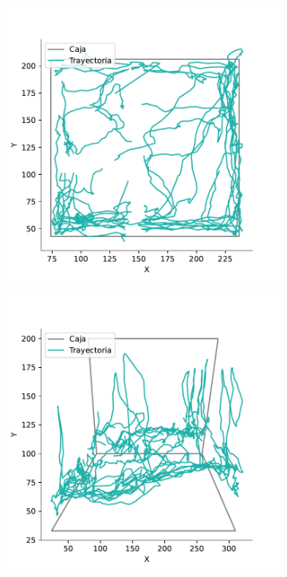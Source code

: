 \begin{figure}[p]
\begin{subfigure}{0.38\textwidth}
    \caption{}
    \label{fig:raw-lat}
  \end{subfigure}
  \begin{subfigure}{0.38\textwidth}
    \centering
    \includegraphics[width=\textwidth]{figures/filtered-trayectory-top-4128-2020-12-02.pdf}
    \caption{}
    \label{fig:filter-top}
  \end{subfigure}
  \begin{subfigure}{0.38\textwidth}
    \centering
    \includegraphics[width=\textwidth]{figures/filtered-trayectory-lateral-4128-2020-12-02.pdf}

\end{subfigure}
\end{figure}
